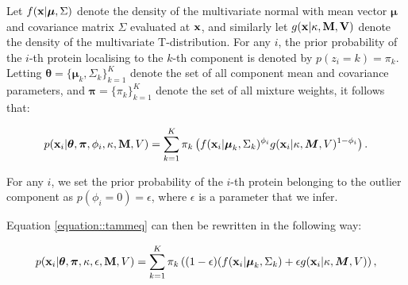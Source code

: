 \documentclass[12pt,english]{article}
\begin{document}
Let  $f({\bf x} | \boldsymbol{\mu}, \Sigma)$ denote the density of
the multivariate normal with mean vector $\boldsymbol{\mu}$ and
covariance matrix $\Sigma$ evaluated at ${\bf x}$, and similarly let $g({\bf x | \kappa, \bf{M}, V} )$ denote the density of the multivariate T-distribution. For any $i$, the prior probability of the $i$-th protein localising to the $k$-th component is denoted by $p(z_i = k) = \pi_k$. Letting
$\boldsymbol{\theta} = \{\boldsymbol{\mu}_k, \Sigma_k \}_{k = 1}^K$
denote the set of all component mean and covariance parameters, and
$\boldsymbol{\pi} = \{\pi_k\}_{k = 1}^K$ denote the set of all mixture
weights, it follows that:

\begin{equation} \label{equation::tammeq}
\begin{split}
p({\bf x}_i| \boldsymbol{\theta}, \boldsymbol{\pi} ,\phi_i, \kappa, {\bf M}, V) &=  \sum_{k=1}^{K}\pi_k\left(f({\bf x}_i|\boldsymbol{\mu}_k, \Sigma_k)^{\phi_i}g({\bf x}_i|\kappa, \boldsymbol{M}, V)^{1 - \phi_i }\right).\\
\end{split}
\end{equation}

For any $i$, we set the prior probability of the $i$-th protein
belonging to the outlier component as $p(\phi_i = 0) = \epsilon$, where $\epsilon$ is a parameter that we infer.

Equation \eqref{equation::tammeq}  can then be rewritten in the following way:

\begin{equation}\label{equation::tammepseq}
\begin{split}
p({\bf x}_i| \boldsymbol{\theta}, \boldsymbol{\pi} , \kappa, \epsilon, {\bf M}, V) &=  \sum_{k=1}^{K}\pi_k\left((1-\epsilon)(f({\bf x}_i |\boldsymbol{\mu}_k, \Sigma_k) + \epsilon g({\bf x}_i|\kappa, \boldsymbol{M}, V)\right),\\
\end{split}
\end{equation}
\end{document}
